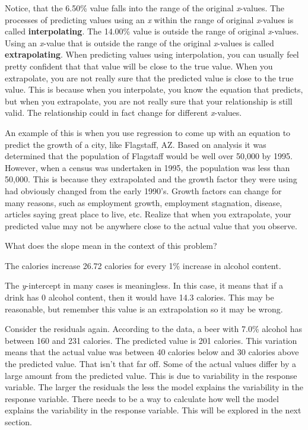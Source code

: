 \documentclass[]{book}
\begin{document}
Notice, that the 6.50\% value falls into the range of the original \emph{x}-values. The processes of predicting values using an \emph{x} within the range of original \emph{x}-values is called \textbf{interpolating}. The 14.00\% value is outside the range of original \emph{x}-values. Using an \emph{x}-value that is outside the range of the original \emph{x}-values is called \textbf{extrapolating}. When predicting values using interpolation, you can usually feel pretty confident that that value will be close to the true value. When you extrapolate, you are not really sure that the predicted value is close to the true value. This is because when you interpolate, you know the equation that predicts, but when you extrapolate, you are not really sure that your relationship is still valid. The relationship could in fact change for different \emph{x}-values.

An example of this is when you use regression to come up with an equation to predict the growth of a city, like Flagstaff, AZ. Based on analysis it was determined that the population of Flagstaff would be well over 50,000 by 1995. However, when a census was undertaken in 1995, the population was less than 50,000. This is because they extrapolated and the growth factor they were using had obviously changed from the early 1990's. Growth factors can change for many reasons, such as employment growth, employment stagnation, disease, articles saying great place to live, etc. Realize that when you extrapolate, your predicted value may not be anywhere close to the actual value that you observe.

What does the slope mean in the context of this problem?

The calories increase 26.72 calories for every 1\% increase in alcohol content.

The \emph{y}-intercept in many cases is meaningless. In this case, it means that if a drink has 0 alcohol content, then it would have 14.3 calories. This may be reasonable, but remember this value is an extrapolation so it may be wrong.

Consider the residuals again. According to the data, a beer with 7.0\% alcohol has between 160 and 231 calories. The predicted value is 201 calories. This variation means that the actual value was between 40 calories below and 30 calories above the predicted value. That isn't that far off. Some of the actual values differ by a large amount from the predicted value. This is due to variability in the response variable. The larger the residuals the less the model explains the variability in the response variable. There needs to be a way to calculate how well the model explains the variability in the response variable. This will be explored in the next section.
\end{document}

